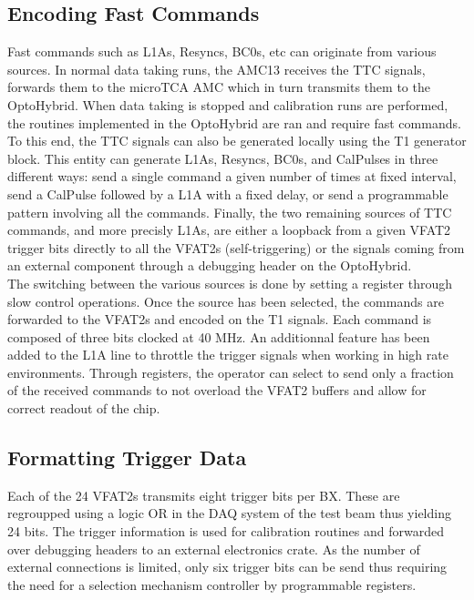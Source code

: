     \subsection{Encoding Fast Commands}

      Fast commands such as L1As, Resyncs, BC0s, etc can originate from various sources. In normal data taking runs, the AMC13 receives the TTC signals, forwards them to the microTCA AMC which in turn transmits them to the OptoHybrid. When data taking is stopped and calibration runs are performed, the routines implemented in the OptoHybrid are ran and require fast commands. To this end, the TTC signals can also be generated locally using the T1 generator block. This entity can generate L1As, Resyncs, BC0s, and CalPulses in three different ways: send a single command a given number of times at fixed interval, send a CalPulse followed by a L1A with a fixed delay, or send a programmable pattern involving all the commands. Finally, the two remaining sources of TTC commands, and more precisly L1As, are either a loopback from a given VFAT2 trigger bits directly to all the VFAT2s (self-triggering) or the signals coming from an external component through a debugging header on the OptoHybrid. \\

      The switching between the various sources is done by setting a register through slow control operations. Once the source has been selected, the commands are forwarded to the VFAT2s and encoded on the T1 signals. Each command is composed of three bits clocked at 40 MHz. An additionnal feature has been added to the L1A line to throttle the trigger signals when working in high rate environments. Through registers, the operator can select to send only a fraction of the received commands to not overload the VFAT2 buffers and allow for correct readout of the chip.

    \subsection{Formatting Trigger Data}

      Each of the 24 VFAT2s transmits eight trigger bits per BX. These are regroupped using a logic OR in the DAQ system of the test beam  thus yielding 24 bits. The trigger information is used for calibration routines and forwarded over debugging headers to an external electronics crate. As the number of external connections is limited, only six trigger bits can be send thus requiring the need for a selection mechanism controller by programmable registers.


